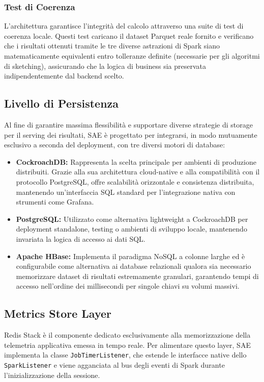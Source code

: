 \documentclass[conference]{IEEEtran}
\begin{document}
\subsubsection{Test di Coerenza}
L'architettura garantisce l'integrità del calcolo attraverso una suite di test di coerenza locale.
Questi test caricano il dataset Parquet reale fornito e verificano che i risultati ottenuti tramite le tre diverse astrazioni di Spark siano matematicamente equivalenti entro tolleranze definite (necessarie per gli algoritmi di sketching), assicurando che la logica di business sia preservata indipendentemente dal backend scelto\@.

\subsection{Livello di Persistenza}\label{subsec:persistence_layer}
Al fine di garantire massima flessibilità e supportare diverse strategie di storage per il serving dei risultati, SAE è progettato per integrarsi, in modo mutuamente esclusivo a seconda del deployment, con tre diversi motori di database:

\begin{itemize}
    \item \textbf{CockroachDB:} Rappresenta la scelta principale per ambienti di produzione distribuiti.
    Grazie alla sua architettura cloud-native e alla compatibilità con il protocollo PostgreSQL, offre scalabilità orizzontale e consistenza distribuita, mantenendo un'interfaccia SQL standard per l'integrazione nativa con strumenti come Grafana.
    \item \textbf{PostgreSQL:} Utilizzato come alternativa lightweight a CockroachDB per deployment standalone, testing o ambienti di sviluppo locale, mantenendo invariata la logica di accesso ai dati SQL.
    \item \textbf{Apache HBase:} Implementa il paradigma NoSQL a colonne larghe ed è configurabile come alternativa ai database relazionali qualora sia necessario memorizzare dataset di risultati estremamente granulari, garantendo tempi di accesso nell'ordine dei millisecondi per singole chiavi su volumi massivi.
\end{itemize}

\subsection{Metrics Store Layer}\label{subsec:metrics_store_layer}
Redis Stack è il componente dedicato esclusivamente alla memorizzazione della telemetria applicativa emessa in tempo reale. 
Per alimentare questo layer, SAE implementa la classe \texttt{JobTimerListener}, che estende le interfacce native dello \texttt{SparkListener} e viene agganciata al bus degli eventi di Spark durante l'inizializzazione della sessione.
\end{document}
